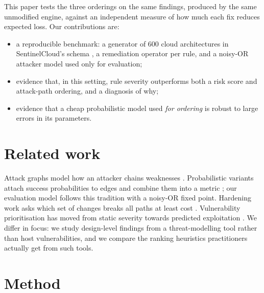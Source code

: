 \documentclass[11pt]{article}
\begin{document}
This paper tests the three orderings on the same findings, produced by the same unmodified engine, against an independent measure of
how much each fix reduces expected loss. Our contributions are:
\begin{itemize}
  \item a reproducible benchmark: a generator of 600 cloud architectures in SentinelCloud's schema \cite{sentinelcloud}, a remediation
        operator per rule, and a noisy-OR attacker model used only for evaluation;
  \item evidence that, in this setting, rule severity outperforms both a risk score and attack-path ordering, and a diagnosis of why;
  \item evidence that a cheap probabilistic model used \emph{for ordering} is robust to large errors in its parameters.
\end{itemize}

\section{Related work}
Attack graphs model how an attacker chains weaknesses \cite{sheyner2002attackgraphs,ou2005mulval}. Probabilistic variants attach
success probabilities to edges and combine them into a metric \cite{wang2008probabilistic,homer2013aggregating}; our evaluation
model follows this tradition with a noisy-OR fixed point. Hardening work asks which set of changes breaks all paths at least cost
\cite{noel2003hardening,dewri2007optimal}. Vulnerability prioritisation has moved from static severity towards predicted exploitation
\cite{jacobs2021epss}. We differ in focus: we study design-level findings from a threat-modelling tool rather than host vulnerabilities,
and we compare the ranking heuristics practitioners actually get from such tools.

\section{Method}
\end{document}
